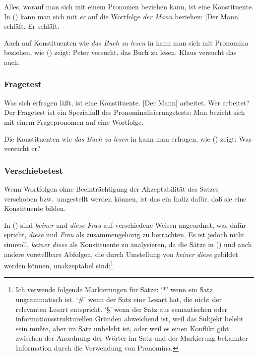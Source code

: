 Alles,
worauf man sich mit einem Pronomen beziehen kann, ist eine Konstituente. 
In () kann man sich \zb mit \emph{er} auf die Wortfolge \emph{der Mann} beziehen:
\eal
\ex {}[Der Mann] schläft.
\ex Er schläft.
\zl

\noindent
Auch auf Konstituenten wie \emph{das Buch zu lesen} in 
kann man sich mit Pronomina beziehen, wie () zeigt:
\eal
\ex Peter versucht, das Buch zu lesen.
\ex Klaus versucht das auch.
\zl


\subsubsection{Fragetest}

Was sich erfragen läßt, ist eine Konstituente.
        \eal
        \ex {}[Der Mann] arbeitet.
        \ex Wer arbeitet?
        \zl
        Der Fragetest ist ein Spezialfall des Pronominalisierungstests: Man bezieht sich mit
        einem Fragepronomen auf eine Wortfolge.

Die Konstituenten wie \emph{das Buch zu lesen} in  kann man erfragen,
wie () zeigt:
\ea
Was versucht er?
\z

\subsubsection{Verschiebetest}

Wenn Wortfolgen ohne Beeinträchtigung der Akzeptabilität des Satzes verschoben
bzw.\ umgestellt werden können, ist das ein Indiz dafür, daß sie eine Konstituente bilden.

        In () sind \emph{keiner} und \emph{diese Frau} auf verschiedene Weisen angeordnet,
        was dafür spricht, \emph{diese} und \emph{Frau} als zusammengehörig zu betrachten.
        \eal
        \zl
Es ist jedoch nicht sinnvoll, \emph{keiner diese} als Konstituente zu analysieren,
da die Sätze in () und auch andere vorstellbare Abfolgen, die durch
Umstellung von \emph{keiner diese} gebildet werden können, unakzeptabel sind:\footnote{
  Ich verwende folgende Markierungen für Sätze: `*'\is{*} wenn ein Satz ungrammatisch ist.
  `\#'\is{\#} wenn der Satz eine Lesart hat, die nicht der relevanten Lesart entspricht.
  `\S'\is{\S} wenn der Satz aus semantischen oder informationsstrukturellen Gründen abweichend ist,
  \zb weil das Subjekt belebt sein müßte, aber im Satz unbelebt ist, oder weil es einen
  Konflikt gibt zwischen der Anordnung der Wörter im Satz und der Markierung bekannter
  Information durch die Verwendung von Pronomina.%
}
\eal
{}
\zl

